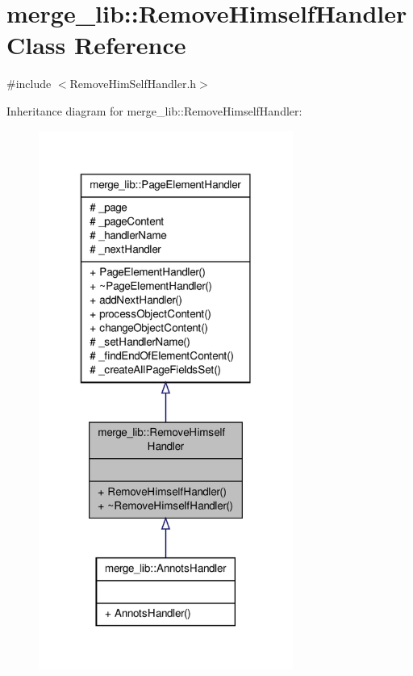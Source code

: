 \hypertarget{classmerge__lib_1_1_remove_himself_handler}{\section{merge\-\_\-lib\-:\-:Remove\-Himself\-Handler Class Reference}
\label{db/db5/classmerge__lib_1_1_remove_himself_handler}
}


{\ttfamily \#include $<$Remove\-Him\-Self\-Handler.\-h$>$}



Inheritance diagram for merge\-\_\-lib\-:\-:Remove\-Himself\-Handler\-:
\nopagebreak
\begin{figure}[H]
\begin{center}
\leavevmode
\includegraphics[width=236pt]{d4/d92/classmerge__lib_1_1_remove_himself_handler__inherit__graph}
\end{center}
\end{figure}


